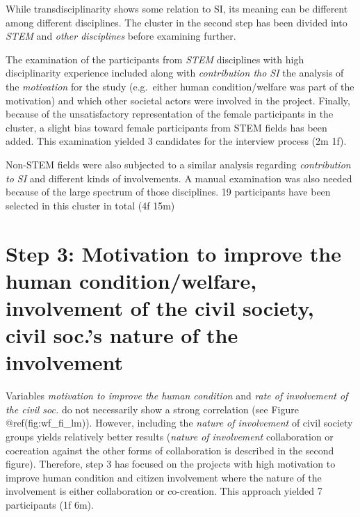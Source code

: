 \documentclass[]{tufte-book}
\begin{document}
While transdisciplinarity shows some relation to SI, its meaning can be
different among different disciplines. The cluster in the second step
has been divided into \emph{STEM} and \emph{other disciplines} before
examining further.

The examination of the participants from \emph{STEM} disciplines with
high disciplinarity experience included along with \emph{contribution
tho SI} the analysis of the \emph{motivation} for the study (e.g.~either
human condition/welfare was part of the motivation) and which other
societal actors were involved in the project. Finally, because of the
unsatisfactory representation of the female participants in the cluster,
a slight bias toward female participants from STEM fields has been
added. This examination yielded 3 candidates for the interview process
(2m \textbar{} 1f).

Non-STEM fields were also subjected to a similar analysis regarding
\emph{contribution to SI} and different kinds of involvements. A manual
examination was also needed because of the large spectrum of those
disciplines. 19 participants have been selected in this cluster in total
(4f \textbar{} 15m)

\hypertarget{step-3-motivation-to-improve-the-human-conditionwelfare-involvement-of-the-civil-society-civil-soc.s-nature-of-the-involvement}{%
\section{Step 3: Motivation to improve the human condition/welfare,
involvement of the civil society, civil soc.'s nature of the
involvement}\label{step-3-motivation-to-improve-the-human-conditionwelfare-involvement-of-the-civil-society-civil-soc.s-nature-of-the-involvement}}

Variables \emph{motivation to improve the human condition} and
\emph{rate of involvement of the civil soc.} do not necessarily show a
strong correlation (see Figure @ref(fig:wf\_fi\_lm)). However, including
the \emph{nature of involvement} of civil society groups yields
relatively better results (\emph{nature of involvement} collaboration or
cocreation against the other forms of collaboration is described in the
second figure). Therefore, step 3 has focused on the projects with high
motivation to improve human condition and citizen involvement where the
nature of the involvement is either collaboration or co-creation. This
approach yielded 7 participants (1f \textbar{} 6m).
\end{document}
